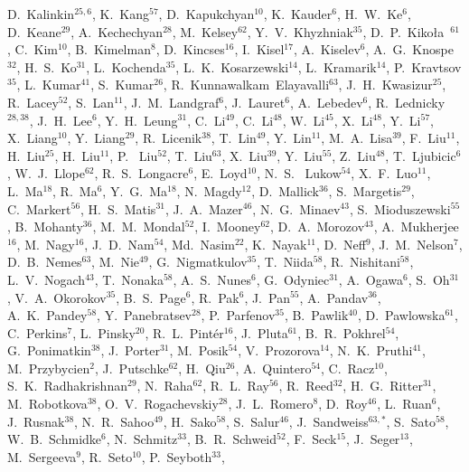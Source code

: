 {D.~Kalinkin$^{25,6}$,
K.~Kang$^{57}$,
D.~Kapukchyan$^{10}$,
K.~Kauder$^{6}$,
H.~W.~Ke$^{6}$,
D.~Keane$^{29}$,
A.~Kechechyan$^{28}$,
M.~Kelsey$^{62}$,
Y.~V.~Khyzhniak$^{35}$,
D.~P.~Kiko\l{}a~$^{61}$,
C.~Kim$^{10}$,
B.~Kimelman$^{8}$,
D.~Kincses$^{16}$,
I.~Kisel$^{17}$,
A.~Kiselev$^{6}$,
A.~G.~Knospe$^{32}$,
H.~S.~Ko$^{31}$,
L.~Kochenda$^{35}$,
L.~K.~Kosarzewski$^{14}$,
L.~Kramarik$^{14}$,
P.~Kravtsov$^{35}$,
L.~Kumar$^{41}$,
S.~Kumar$^{26}$,
R.~Kunnawalkam~Elayavalli$^{63}$,
J.~H.~Kwasizur$^{25}$,
R.~Lacey$^{52}$,
S.~Lan$^{11}$,
J.~M.~Landgraf$^{6}$,
J.~Lauret$^{6}$,
A.~Lebedev$^{6}$,
R.~Lednicky$^{28,38}$,
J.~H.~Lee$^{6}$,
Y.~H.~Leung$^{31}$,
C.~Li$^{49}$,
C.~Li$^{48}$,
W.~Li$^{45}$,
X.~Li$^{48}$,
Y.~Li$^{57}$,
X.~Liang$^{10}$,
Y.~Liang$^{29}$,
R.~Licenik$^{38}$,
T.~Lin$^{49}$,
Y.~Lin$^{11}$,
M.~A.~Lisa$^{39}$,
F.~Liu$^{11}$,
H.~Liu$^{25}$,
H.~Liu$^{11}$,
P.~ Liu$^{52}$,
T.~Liu$^{63}$,
X.~Liu$^{39}$,
Y.~Liu$^{55}$,
Z.~Liu$^{48}$,
T.~Ljubicic$^{6}$,
W.~J.~Llope$^{62}$,
R.~S.~Longacre$^{6}$,
E.~Loyd$^{10}$,
N.~S.~ Lukow$^{54}$,
X.~F.~Luo$^{11}$,
L.~Ma$^{18}$,
R.~Ma$^{6}$,
Y.~G.~Ma$^{18}$,
N.~Magdy$^{12}$,
D.~Mallick$^{36}$,
S.~Margetis$^{29}$,
C.~Markert$^{56}$,
H.~S.~Matis$^{31}$,
J.~A.~Mazer$^{46}$,
N.~G.~Minaev$^{43}$,
S.~Mioduszewski$^{55}$,
B.~Mohanty$^{36}$,
M.~M.~Mondal$^{52}$,
I.~Mooney$^{62}$,
D.~A.~Morozov$^{43}$,
A.~Mukherjee$^{16}$,
M.~Nagy$^{16}$,
J.~D.~Nam$^{54}$,
Md.~Nasim$^{22}$,
K.~Nayak$^{11}$,
D.~Neff$^{9}$,
J.~M.~Nelson$^{7}$,
D.~B.~Nemes$^{63}$,
M.~Nie$^{49}$,
G.~Nigmatkulov$^{35}$,
T.~Niida$^{58}$,
R.~Nishitani$^{58}$,
L.~V.~Nogach$^{43}$,
T.~Nonaka$^{58}$,
A.~S.~Nunes$^{6}$,
G.~Odyniec$^{31}$,
A.~Ogawa$^{6}$,
S.~Oh$^{31}$,
V.~A.~Okorokov$^{35}$,
B.~S.~Page$^{6}$,
R.~Pak$^{6}$,
J.~Pan$^{55}$,
A.~Pandav$^{36}$,
A.~K.~Pandey$^{58}$,
Y.~Panebratsev$^{28}$,
P.~Parfenov$^{35}$,
B.~Pawlik$^{40}$,
D.~Pawlowska$^{61}$,
C.~Perkins$^{7}$,
L.~Pinsky$^{20}$,
R.~L.~Pint\'{e}r$^{16}$,
J.~Pluta$^{61}$,
B.~R.~Pokhrel$^{54}$,
G.~Ponimatkin$^{38}$,
J.~Porter$^{31}$,
M.~Posik$^{54}$,
V.~Prozorova$^{14}$,
N.~K.~Pruthi$^{41}$,
M.~Przybycien$^{2}$,
J.~Putschke$^{62}$,
H.~Qiu$^{26}$,
A.~Quintero$^{54}$,
C.~Racz$^{10}$,
S.~K.~Radhakrishnan$^{29}$,
N.~Raha$^{62}$,
R.~L.~Ray$^{56}$,
R.~Reed$^{32}$,
H.~G.~Ritter$^{31}$,
M.~Robotkova$^{38}$,
O.~V.~Rogachevskiy$^{28}$,
J.~L.~Romero$^{8}$,
D.~Roy$^{46}$,
L.~Ruan$^{6}$,
J.~Rusnak$^{38}$,
N.~R.~Sahoo$^{49}$,
H.~Sako$^{58}$,
S.~Salur$^{46}$,
J.~Sandweiss$^{63,*}$,
S.~Sato$^{58}$,
W.~B.~Schmidke$^{6}$,
N.~Schmitz$^{33}$,
B.~R.~Schweid$^{52}$,
F.~Seck$^{15}$,
J.~Seger$^{13}$,
M.~Sergeeva$^{9}$,
R.~Seto$^{10}$,
P.~Seyboth$^{33}$,
}
